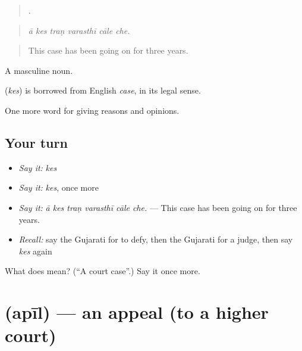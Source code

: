 \begin{quote}
     .
\end{quote}

\begin{quote}
\emph{ā kes traṇ varasthī cāle che.}
\end{quote}

\begin{quote}
This case has been going on for three years.
\end{quote}

A masculine noun.

\begin{cousinweb}
\textbf{} (\emph{kes}) is borrowed from English \emph{case}, in its legal sense.
\end{cousinweb}

\begin{grammarlens}[title={What you've built}]
One more word for giving reasons and opinions.
\end{grammarlens}

\subsection*{Your turn}
\begin{itemize}
\raggedright
  \item \emph{Say it:} \emph{kes}
  \item \emph{Say it:} \emph{kes}, once more
  \item \emph{Say it:} \emph{ā kes traṇ varasthī cāle che.} — This case has been going on for three years.
  \item \emph{Recall:} say the Gujarati for to defy, then the Gujarati for a judge, then say \emph{kes} again
\end{itemize}

\begin{tcolorbox}[breakable,colback=teal!4,colframe=teal!35!black,title={Before you move on}]
What does  mean? (\textquotedblleft{}A court case\textquotedblright{}.) Say it once more.
\end{tcolorbox}
\section[\texorpdfstring{\gu{અપીલ} (apīl)}{અપીલ (apīl)}]{ (apīl) — an appeal (to a higher court)}

\label{lesson:GU-C348-apil}



